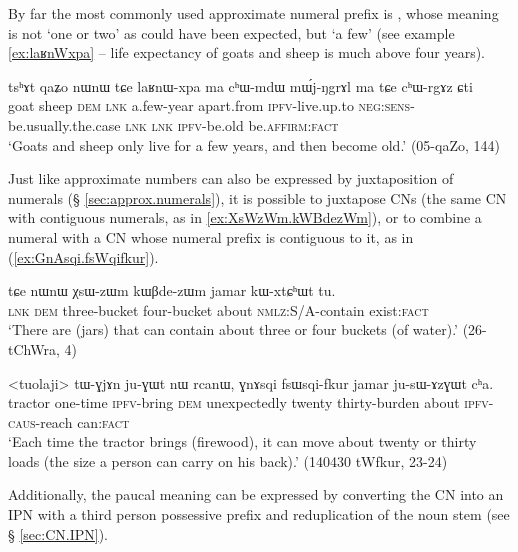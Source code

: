 By far the most commonly used approximate numeral prefix is , whose meaning is not  `one or two' as could have been expected, but  `a few' (see example \ref{ex:laʁnWxpa} -- life expectancy of goats and sheep is much above four years).

\begin{exe}
\ex \label{ex:laʁnWxpa}
\gll tsʰɤt qaʑo nɯnɯ tɕe laʁnɯ-xpa ma cʰɯ-mdɯ mɯ́j-ŋgrɤl ma tɕe cʰɯ-rgɤz ɕti \\
goat sheep \textsc{dem} \textsc{lnk} a.few-year apart.from \textsc{ipfv}-live.up.to \textsc{neg}:\textsc{sens}-be.usually.the.case \textsc{lnk} \textsc{lnk} \textsc{ipfv}-be.old be.\textsc{affirm}:\textsc{fact} \\
\glt `Goats and sheep only live for a few years, and then become old.' (05-qaZo, 144)
\end{exe}

Just like approximate numbers can also be expressed by juxtaposition of numerals  (§ \ref{sec:approx.numerals}), it is possible to juxtapose CNs (the same CN with contiguous numerals, as in \ref{ex:XsWzWm.kWBdezWm}), or to combine a numeral with a CN whose numeral prefix is contiguous to it, as in (\ref{ex:GnAsqi.fsWqifkur}).

\begin{exe}
\ex \label{ex:XsWzWm.kWBdezWm}
 \gll tɕe nɯnɯ χsɯ-zɯm kɯβde-zɯm jamar kɯ-xtɕʰɯt tu. \\
 \textsc{lnk} \textsc{dem} three-bucket four-bucket about \textsc{nmlz}:S/A-contain exist:\textsc{fact} \\
 \glt `There are (jars) that can contain about three or four buckets (of water).' (26-tChWra, 4)
\end{exe}

\begin{exe}
\ex \label{ex:GnAsqi.fsWqifkur}
 \gll <tuolaji> tɯ-ɣjɤn ju-ɣɯt nɯ rcanɯ, ɣnɤsqi fsɯsqi-fkur jamar ju-sɯ-ɤzɣɯt cʰa.  \\
 tractor one-time \textsc{ipfv}-bring \textsc{dem} unexpectedly twenty thirty-burden about \textsc{ipfv}-\textsc{caus}-reach can:\textsc{fact} \\
 \glt `Each time the tractor brings (firewood), it can move about twenty or thirty loads (the size a person can carry on his back).' (140430 tWfkur, 23-24)
\end{exe}

Additionally, the paucal meaning can be expressed by converting the CN into an IPN with a third person possessive prefix and reduplication of the noun stem (see § \ref{sec:CN.IPN}).

